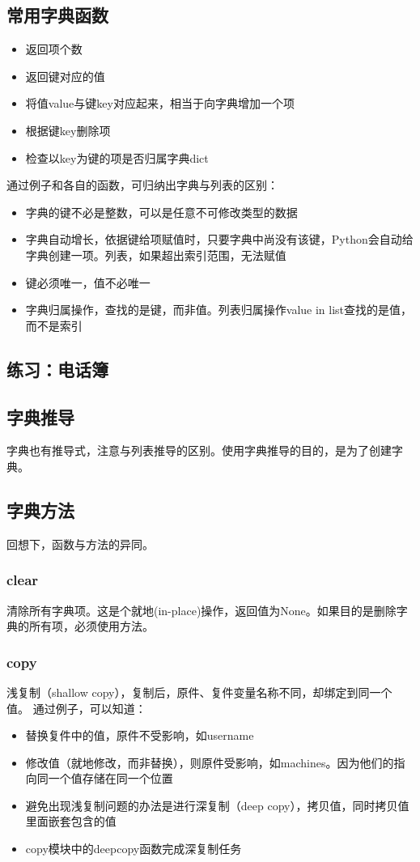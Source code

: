 \subsection{常用字典函数}
\begin{itemize}
\item {} 返回项个数
\item {} 返回键对应的值
\item {} 将值value与键key对应起来，相当于向字典增加一个项
\item {} 根据键key删除项
\item {} 检查以key为键的项是否归属字典dict
\end{itemize}
通过例子和各自的函数，可归纳出字典与列表的区别：
\begin{itemize}
\item 字典的键不必是整数，可以是任意不可修改类型的数据
\item 字典自动增长，依据键给项赋值时，只要字典中尚没有该键，Python会自动给字典创建一项。列表，如果超出索引范围，无法赋值
\item 键必须唯一，值不必唯一
\item 字典归属操作，查找的是键，而非值。列表归属操作value in list查找的是值，而不是索引
\end{itemize}
\subsection{练习：电话簿}
\subsection{字典推导}
字典也有推导式，注意与列表推导的区别。使用字典推导的目的，是为了创建字典。
\subsection{字典方法}
回想下，函数与方法的异同。
\subsubsection{clear}
清除所有字典项。这是个就地(in-place)操作，返回值为None。如果目的是删除字典的所有项，必须使用方法。
\subsubsection{copy}
浅复制（shallow copy），复制后，原件、复件变量名称不同，却绑定到同一个值。
通过例子，可以知道：
\begin{itemize}
\item 替换复件中的值，原件不受影响，如username
\item 修改值（就地修改，而非替换），则原件受影响，如machines。因为他们的指向同一个值存储在同一个位置
\item 避免出现浅复制问题的办法是进行深复制（deep copy），拷贝值，同时拷贝值里面嵌套包含的值
\item copy模块中的deepcopy函数完成深复制任务
\end{itemize}
